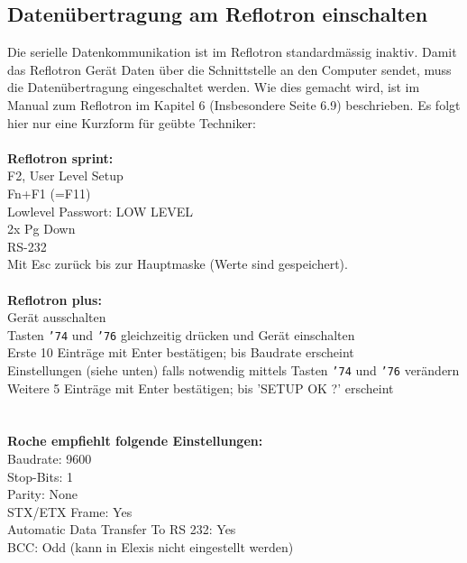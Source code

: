 \documentclass[a4paper]{scrartcl}
\def\<{{\tt\char'74}}
\def\>{{\tt\char'76}}
\begin{document}
\subsection{Daten\"ubertragung am Reflotron einschalten}
Die serielle Datenkommunikation ist im Reflotron standardm\"assig inaktiv. Damit das Reflotron Ger\"at Daten \"uber die Schnittstelle an den Computer sendet, muss die Daten\"ubertragung eingeschaltet werden. Wie dies gemacht wird, ist im Manual zum Reflotron im Kapitel 6 (Insbesondere Seite 6.9) beschrieben. Es folgt hier nur eine Kurzform f\"ur ge\"ubte Techniker:\\
\\
\textbf{Reflotron sprint:}\\
F2, User Level Setup\\
Fn+F1 (=F11)\\
Lowlevel Passwort: LOW LEVEL\\
2x Pg Down\\
RS-232\\
Mit Esc zur\"uck bis zur Hauptmaske (Werte sind gespeichert).\\
\\
\textbf{Reflotron plus:}\\
Ger\"at ausschalten\\
Tasten \< und \> gleichzeitig dr\"ucken und Ger\"at einschalten\\
Erste 10 Eintr\"age mit Enter best\"atigen; bis Baudrate erscheint\\
Einstellungen (siehe unten) falls notwendig mittels Tasten \< und \> ver\"andern\\
Weitere 5 Eintr\"age mit Enter best\"atigen; bis 'SETUP OK ?' erscheint\\
\\
\\
\textbf{Roche empfiehlt folgende Einstellungen:}\\
Baudrate: 9600\\
Stop-Bits: 1\\
Parity: None\\
STX/ETX Frame: Yes\\
Automatic Data Transfer To RS 232: Yes\\
BCC: Odd (kann in Elexis nicht eingestellt werden)\\
\end{document}
